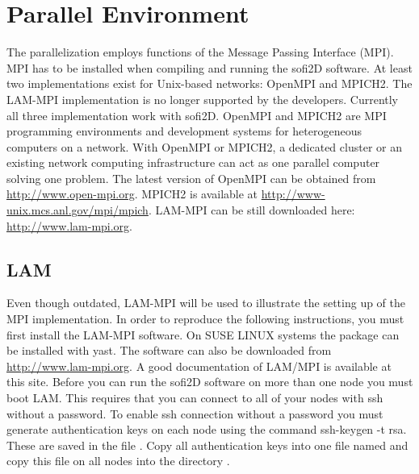 \documentclass[11pt,onecolumn,oneside]{article}
\begin{document}
\section{Parallel Environment}
The parallelization employs functions of the Message Passing Interface (MPI). MPI has to be installed when compiling and running the sofi2D software. At least two implementations exist for Unix-based networks: OpenMPI and MPICH2. The LAM-MPI implementation is no longer supported by the developers. Currently all three implementation work with sofi2D. OpenMPI and MPICH2 are MPI programming environments and development systems for heterogeneous computers on a network. With OpenMPI or MPICH2, a dedicated cluster or an existing network computing  infrastructure can act as one parallel computer solving one problem. The latest version of OpenMPI can be obtained from \url{http://www.open-mpi.org}. MPICH2 is available at \url{http://www-unix.mcs.anl.gov/mpi/mpich}. LAM-MPI can be still downloaded here: \url{http://www.lam-mpi.org}.

\subsection{LAM}
Even though outdated, LAM-MPI will be used to illustrate the setting up of the MPI implementation. In order to reproduce the following instructions, you must first install the LAM-MPI software. 
On SUSE LINUX systems the package can be installed with yast. The software can also be downloaded from \url{http://www.lam-mpi.org}. A good documentation of LAM/MPI is available at this site. Before you can run the sofi2D software on more than one node you must boot LAM. This requires that you can connect to all of your nodes with ssh without a password. To enable ssh connection without a password you must generate authentication keys on each node using the command ssh-keygen -t rsa. These are saved in the file . Copy all authentication keys into one file named  and copy this file on all nodes into the directory . 
\end{document}
